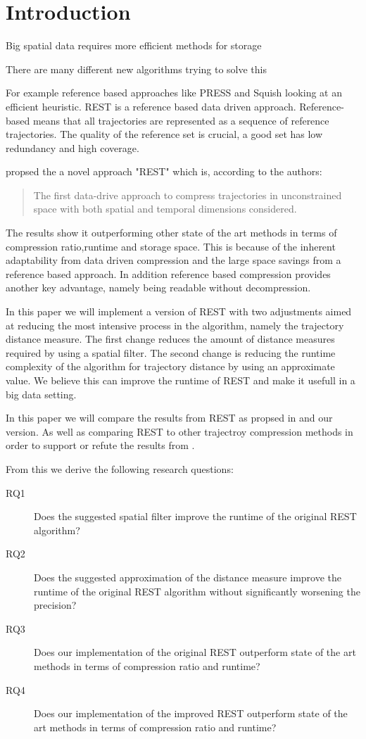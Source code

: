 \chapter{Introduction}
Big spatial data requires more efficient methods for storage

There are many different new algorithms trying to solve this

For example reference based approaches like PRESS and Squish looking at an efficient heuristic. REST is a reference based data driven approach. Reference-based means that all trajectories are represented as a sequence of reference trajectories. The quality of the reference set is crucial, a good set has low redundancy and high coverage.

\cite{zhao2018rest} propsed the a novel approach "REST" which is, according to the authors:
\begin{quote}
    The first data-drive approach to compress trajectories in unconstrained space with both spatial and temporal dimensions considered.
\end{quote}
The results show it outperforming other state of the art methods in terms of compression ratio,runtime and storage space. This is because of the inherent adaptability from data driven compression and the large space savings from a reference based approach. In addition reference based compression provides another key advantage, namely being readable without decompression.

In this paper we will implement a version of REST with two adjustments aimed at reducing the most intensive process in the algorithm, namely the trajectory distance measure. The first change reduces the amount of distance measures required by using a spatial filter. The second change is reducing the runtime complexity of the algorithm for trajectory distance by using an approximate value. We believe this can improve the runtime of REST and make it usefull in a big data setting.

In this paper we will compare the results from REST as propsed in \cite{zhao2018rest} and our version. As well as comparing REST to other trajectroy compression methods in order to support or refute the results from \cite{zhao2018rest}.

From this we derive the following research questions:
\begin{description}
    \item[RQ1] Does the suggested spatial filter improve the runtime of the original REST algorithm?
    \item[RQ2] Does the suggested approximation of the distance measure improve the runtime of the original REST algorithm without significantly worsening the precision?
    \item[RQ3] Does our implementation of the original REST outperform state of the art methods in terms of compression ratio and runtime?
    \item[RQ4] Does our implementation of the improved REST outperform state of the art methods in terms of compression ratio and runtime?
\end{description}